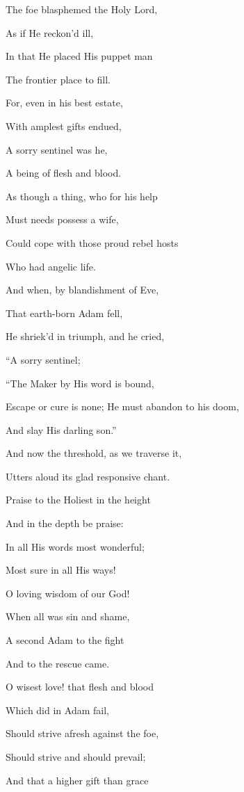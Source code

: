 The foe
blasphemed the Holy Lord,

As if He reckon'd ill,

In that
He placed His puppet man

The frontier place to fill.

For, even
in his best estate,

With amplest gifts endued,

A sorry
sentinel was he,

A being of flesh and blood.

As though
a thing, who for his help

Must needs possess a wife,

Could
cope with those proud rebel hosts

Who had angelic life.

And when,
by blandishment of Eve,

That earth-born Adam fell,

He
shriek'd in triumph, and he cried,

``A sorry sentinel;

``The
Maker by His word is bound,

Escape or cure is none; He must
abandon to his doom,

And slay His darling son.''


And now the threshold, as we traverse it,

Utters aloud its glad responsive chant.


Praise to
the Holiest in the height

And in the depth be praise:

In all
His words most wonderful;

Most sure in all His ways!

O loving
wisdom of our God!

When all was sin and shame,

A
second Adam to the fight

And to the rescue came.

O wisest
love! that flesh and blood

Which did in Adam fail,

Should
strive afresh against the foe,

Should strive and should prevail; 

And that
a higher gift than grace

